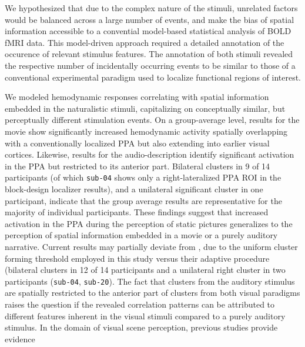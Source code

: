 \documentclass[english]{article}
\begin{document}
We hypothesized that due to the complex nature of the stimuli,
unrelated factors would be balanced across a large number of events, and make
the bias of spatial information accessible to a convential model-based
statistical analysis of BOLD fMRI data.
This model-driven approach required a detailed annotation of the
occurence of relevant stimulus features.
The annotation of both stimuli revealed the respective number of incidentally occurring
events to be similar to those of a conventional experimental paradigm used to
localize functional regions of interest.

We modeled hemodynamic responses correlating with spatial information embedded
in the naturalistic stimuli, capitalizing on conceptually similar, but
perceptually different stimulation events.
On a group-average level, results for the movie show significantly
increased hemodynamic activity spatially overlapping with a conventionally
localized PPA but also extending into earlier visual cortices.
Likewise, results for the audio-description identify significant activation in
the PPA but restricted to its anterior part.
Bilateral clusters in 9 of 14
participants (of which \texttt{sub-04} shows only a right-lateralized PPA ROI
in the block-design localizer results), and a unilateral
significant cluster in one participant, indicate that the group average results
are representative for the majority of individual participants.
These findings suggest that increased activation in the PPA during the
perception of static pictures generalizes to the perception of spatial
information embedded in a movie or a purely auditory narrative.
%
Current results may partially deviate from \cite{sengupta2016extension}, due to
the uniform cluster forming threshold employed in this study versus their
adaptive procedure (bilateral clusters in 12 of 14 participants and a unilateral
right cluster in two participants (\texttt{sub-04}, \texttt{sub-20}).
The fact that clusters from the auditory stimulus are spatially restricted to
the anterior part of clusters from both visual paradigms raises the question if
the revealed correlation patterns can be attributed to different features
inherent in the visual stimuli compared to a purely auditory stimulus.
In the domain of visual scene perception, previous studies provide evidence
\end{document}
